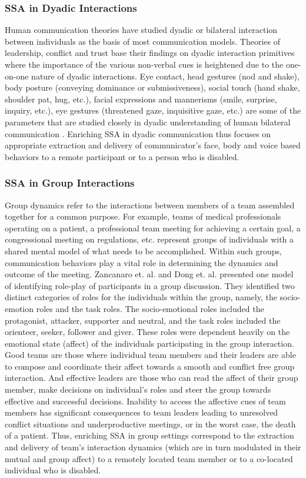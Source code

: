 \documentclass[oneside,11pt]{memoir}
\begin{document}
\subsubsection{SSA in Dyadic Interactions}
Human communication theories have studied dyadic or bilateral interaction between individuals as the basis of most communication models. Theories of leadership, conflict and trust base their findings on dyadic interaction primitives where the importance of the various non-verbal cues is heightened due to the one-on-one nature of dyadic interactions. Eye contact, head gestures (nod and shake), body posture (conveying dominance or submissiveness), social touch (hand shake, shoulder pat, hug, etc.), facial expressions and mannerisms (smile, surprise, inquiry, etc.), eye gestures (threatened gaze, inquisitive gaze, etc.) are some of the parameters that are studied closely in dyadic understanding of human bilateral communication \cite{altmann_analysis_2007}. Enriching SSA in dyadic communication thus focuses on appropriate extraction and delivery of communicator's face, body and voice based behaviors to a remote participant or to a person who is disabled.

\subsubsection{SSA in Group Interactions}
Group dynamics refer to the interactions between members of a team assembled together for a common purpose. For example, teams of medical professionals operating on a patient, a professional team meeting for achieving a certain goal, a congressional meeting on regulations, etc. represent groups of individuals with a shared mental model of what needs to be accomplished. Within such groups, communication behaviors play a vital role in determining the dynamics and outcome of the meeting. Zancanaro et. al. \cite{zancanaro_automatic_2006} and Dong et. al.  \cite{dong_using_2007} presented one model of identifying role-play of participants in a group discussion. They identified two distinct categories of roles for the individuals within the group, namely, the socio-emotion roles and the task roles. The socio-emotional roles included the protagonist, attacker, supporter and neutral, and the task roles included the orienteer, seeker, follower and giver. These roles were dependent heavily on the emotional state (affect) of the individuals participating in the group interaction. Good teams are those where individual team members and their leaders are able to compose and coordinate their affect towards a smooth and conflict free group interaction. And effective leaders are those who can read the affect of their group member, make decisions on individual's roles and steer the group towards effective and successful decisions. Inability to access the affective cues of team members has significant consequences to team leaders leading to unresolved conflict situations and underproductive meetings, or in the worst case, the death of a patient. Thus, enriching SSA in group settings correspond to the extraction and delivery of team's interaction dynamics (which are in turn modulated in their mutual and group affect) to a remotely located team member or to a co-located individual who is disabled.
\end{document}
